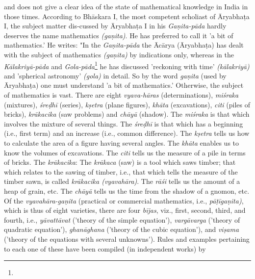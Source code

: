 \documentclass[10pt, openany]{book}
\begin{document}
\newpage

\englishfont{}
{and does not give a clear idea of the state of mathematical}
{knowledge in India in those times. According to Bhāskara I, the most competent scholiast of Āryabhaṭa I, the subject matter dis-cussed by Āryabhaṭa I in his \textit{Gaṇita-pāda }hardly}
{deserves the name mathematics \textit{(gaṇita)}. He has preferred to call}
it 'a bit of mathematics.' He writes: {\eqt "In the \textit{Gaṇita-pāda} the Ācārya (Āryabhaṭa) has dealt with the subject of mathematics \textit{(gaṇita)} by indications only, whereas in the \textit{Kālakriyā-pāda }and {\textit{Gola-pāda}\renewcommand{\thefootnote}{1}\footnote{\hspace{-2mm} } he has discussed 'reckoning with time'}
{\textit{(kālakriyā) }and 'spherical astronomy' \textit{(gola)} in detail. So} by the word \textit{gaṇita} (used by Āryabhaṭa) one must understand 'a bit of mathematics.' Otherwise, the subject of mathematics is vast. There are eight \textit{vyava-hāras} (determinations), \textit{miśraka} (mixtures), \textit{śreḍhī} (series), \textit{kṣetra }(plane figures), \textit{khāta}
(excavations), \textit{citi} (piles of bricks), {\textit{krākacika} (saw problems) and}
\textit{chāyā} (shadow). The \textit{miśraka }is that which involves the mixture of several things. The \textit{śreḍhī} is that which has a beginning (i.e., first term) and an increase (i.e., common difference). The \textit{kṣetra }tells us how to calculate the area of a figure having several angles. The \textit{khāta} enables us to know the volumes of excavations. The \textit{citi} tells us the measure of a pile in terms of bricks. The \textit{krākacika}: The \textit{krākaca} (saw) is a tool which saws timber; that which relates to the sawing of timber, i.e., that which tells the measure of the timber sawn, is called \textit{krākacika (vyavahāra)}. The \textit{rāśi} tells us the amount of a
heap
{of grain, etc. The \textit{chāyā} tells us the time from the shadow of}
{a gnomon, etc. Of the \textit{vyavahāra-gaṇita} (practical or commercial}
{mathematics, i.e., \textit{pāṭīgaṇita)}, which is thus of eight}
{varieties, there are four\textit{ bījas}, viz., first, second, third, and}
{fourth, i.e., \textit{yāvattāvat} ('theory of the simple equation'),
\textit{vargāvarga}}
{('theory of quadratic equation'), \textit{ghanāghana} ('theory of the}
{cubic equation'), and \textit{viṣama }('theory of the equations with}
{several unknowns'). Rules and examples pertaining to each}
{one of these have been compiled (in independent works) by}}
\end{document}
